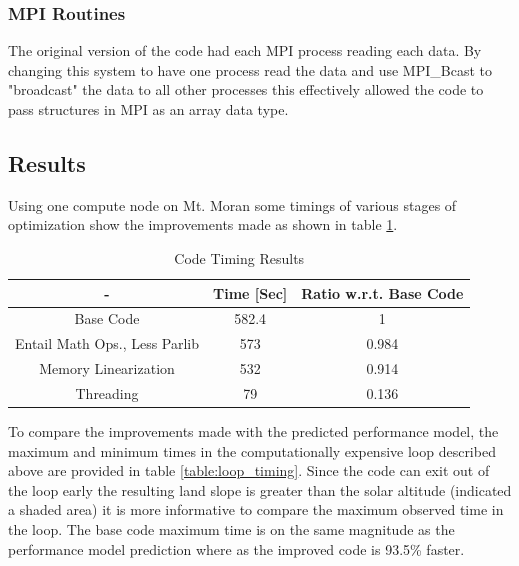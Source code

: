 \documentclass[]{article}%
\begin{document}
\subsubsection{MPI Routines}

The original version of the code had each MPI process reading each data. By changing this system to have one process read the data and use MPI\_Bcast to "broadcast" the data to all other processes this effectively allowed the code to pass structures in MPI as an array data type.



\subsection{Results}

Using one compute node on Mt. Moran some timings of various stages of optimization show the improvements made as shown in table \ref{table:code_timing}.

\begin{table}[ht]
\caption{Code Timing Results}
\centering
\begin{tabular}{c c c}
\hline\hline
 - & Time [Sec]& Ratio w.r.t. Base Code \\ [0.5ex] 
\hline
Base Code & 582.4 & 1 \\ 
Entail Math Ops., Less Parlib & 573 & 0.984\\
Memory Linearization & 532 & 0.914\\
Threading & 79 & 0.136\\
\hline
\end{tabular}
\label{table:code_timing}
\end{table} 

To compare the improvements made with the predicted performance model, the maximum and minimum times in the computationally expensive loop described above are provided in table \ref{table:loop_timing}. Since the code can exit out of the loop early the resulting land slope is greater than the solar altitude (indicated a shaded area) it is more informative to compare the maximum observed time in the loop. The base code maximum time is on the same magnitude as the performance model prediction where as the improved code is 93.5\% faster.
\end{document}

